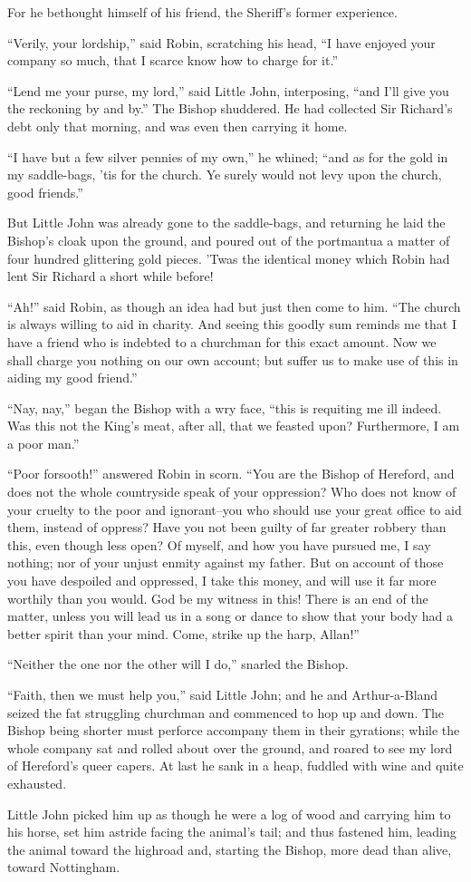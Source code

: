 For he bethought himself of his friend, the Sheriff's former experience.

``Verily, your lordship,'' said Robin, scratching his head, ``I have
enjoyed your company so much, that I scarce know how to charge for it.''

``Lend me your purse, my lord,'' said Little John, interposing, ``and
I'll give you the reckoning by and by.'' The Bishop shuddered. He had
collected Sir Richard's debt only that morning, and was even then
carrying it home.

``I have but a few silver pennies of my own,'' he whined; ``and as for
the gold in my saddle-bags, 'tis for the church. Ye surely would not
levy upon the church, good friends.''

But Little John was already gone to the saddle-bags, and returning he
laid the Bishop's cloak upon the ground, and poured out of the
portmantua a matter of four hundred glittering gold pieces. 'Twas the
identical money which Robin had lent Sir Richard a short while before!

``Ah!'' said Robin, as though an idea had but just then come to him.
``The church is always willing to aid in charity. And seeing this goodly
sum reminds me that I have a friend who is indebted to a churchman for
this exact amount. Now we shall charge you nothing on our own account;
but suffer us to make use of this in aiding my good friend.''

``Nay, nay,'' began the Bishop with a wry face, ``this is requiting me
ill indeed. Was this not the King's meat, after all, that we feasted
upon? Furthermore, I am a poor man.''

``Poor forsooth!'' answered Robin in scorn. ``You are the Bishop of
Hereford, and does not the whole countryside speak of your oppression?
Who does not know of your cruelty to the poor and ignorant--you who
should use your great office to aid them, instead of oppress? Have you
not been guilty of far greater robbery than this, even though less open?
Of myself, and how you have pursued me, I say nothing; nor of your
unjust enmity against my father. But on account of those you have
despoiled and oppressed, I take this money, and will use it far more
worthily than you would. God be my witness in this! There is an end of
the matter, unless you will lead us in a song or dance to show that your
body had a better spirit than your mind. Come, strike up the harp,
Allan!''

``Neither the one nor the other will I do,'' snarled the Bishop.

``Faith, then we must help you,'' said Little John; and he and
Arthur-a-Bland seized the fat struggling churchman and commenced to hop
up and down. The Bishop being shorter must perforce accompany them in
their gyrations; while the whole company sat and rolled about over the
ground, and roared to see my lord of Hereford's queer capers. At last he
sank in a heap, fuddled with wine and quite exhausted.

Little John picked him up as though he were a log of wood and carrying
him to his horse, set him astride facing the animal's tail; and thus
fastened him, leading the animal toward the highroad and, starting the
Bishop, more dead than alive, toward Nottingham.
